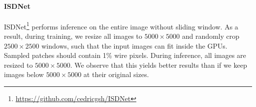 \documentclass[10pt,twocolumn,letterpaper]{article}
\begin{document}
\vspace{-2mm}
\paragraph{ISDNet~\cite{isdnet}}
ISDNet\footnote{\href{https://github.com/cedricgsh/ISDNet}{https://github.com/cedricgsh/ISDNet}} performs inference on the entire image without sliding window. As a result, during training, we resize all images to $5000\times 5000$ and randomly crop $2500\times 2500$ windows, such that the input images can fit inside the GPUs. Sampled patches should contain 1\% wire pixels. During inference, all images are resized to $5000\times 5000$. We observe that this yields better results than if we keep images below $5000\times 5000$ at their original sizes.



{\small


}
\end{document}
